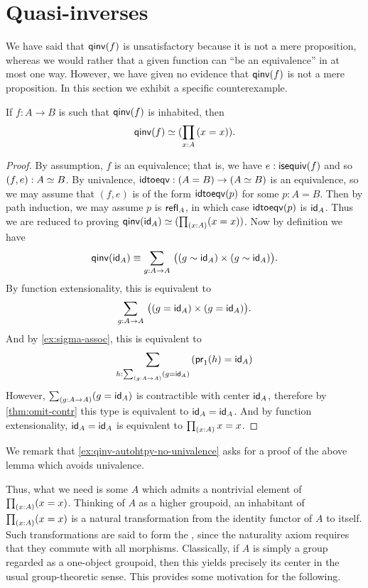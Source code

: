 \section{Quasi-inverses}
\label{sec:quasi-inverses}

%
We have said that $\qinv(f)$ is unsatisfactory because it is not a mere proposition, whereas we would rather that a given function can ``be an equivalence'' in at most one way.
However, we have given no evidence that $\qinv(f)$ is not a mere proposition.
In this section we exhibit a specific counterexample.

\begin{lem}\label{lem:qinv-autohtpy}
  If $f:A\to B$ is such that $\qinv (f)$ is inhabited, then
  \[\eqv{\qinv(f)}{(\prd{x:A}(x=x))}.\]
\end{lem}
\begin{proof}
  By assumption, $f$ is an equivalence; that is, we have $e:\isequiv(f)$ and so $(f,e):\eqv A B$.
  By univalence, $\idtoeqv:(A=B) \to (\eqv A B)$ is an equivalence, so we may assume that $(f,e)$ is of the form $\idtoeqv(p)$ for some $p:A=B$.
  Then by path induction, we may assume $p$ is $\refl{A}$, in which case $\idtoeqv(p)$ is $\idfunc[A]$.
  Thus we are reduced to proving $\eqv{\qinv(\idfunc[A])}{(\prd{x:A}(x=x))}$.
  Now by definition we have
  \[ \qinv(\idfunc[A]) \jdeq
  \sm{g:A\to A} \big((g \htpy \idfunc[A]) \times (g \htpy \idfunc[A])\big).
  \]
  By function extensionality, this is equivalent to
  \[ \sm{g:A\to A} \big((g = \idfunc[A]) \times (g = \idfunc[A])\big).
  \]
  And by \autoref{ex:sigma-assoc}, this is equivalent to
  \[ \sm{h:\sm{g:A\to A} (g = \idfunc[A])} (\proj1(h) = \idfunc[A])
  \]
  However, $\sm{g:A\to A} (g = \idfunc[A])$ is contractible with center $\idfunc[A]$, therefore by \autoref{thm:omit-contr} this type is equivalent to $\idfunc[A] = \idfunc[A]$.
  And by function extensionality, $\idfunc[A] = \idfunc[A]$ is equivalent to $\prd{x:A} x=x$.
\end{proof}

\noindent
We remark that \autoref{ex:qinv-autohtpy-no-univalence} asks for a proof of the above lemma which avoids univalence.

Thus, what we need is some $A$ which admits a nontrivial element of $\prd{x:A}(x=x)$.
Thinking of $A$ as a higher groupoid, an inhabitant of $\prd{x:A}(x=x)$ is a natural transformation from the identity functor of $A$ to itself.
Such transformations are said to form the ,
%
%
since the naturality axiom requires that they commute with all morphisms.
Classically, if $A$ is simply a group regarded as a one-object groupoid, then this yields precisely its center in the usual group-theoretic sense.
This provides some motivation for the following.

